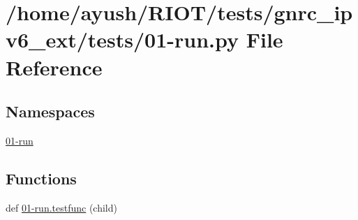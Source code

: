 \hypertarget{gnrc__ipv6__ext_2tests_201-run_8py}{}\section{/home/ayush/\+R\+I\+O\+T/tests/gnrc\+\_\+ipv6\+\_\+ext/tests/01-\/run.py File Reference}
\label{gnrc__ipv6__ext_2tests_201-run_8py}
\subsection*{Namespaces}
\begin{DoxyCompactItemize}
\item 
 \hyperlink{namespace01-run}{01-\/run}
\end{DoxyCompactItemize}
\subsection*{Functions}
\begin{DoxyCompactItemize}
\item 
def \hyperlink{namespace01-run_aff983ffd4ab0e6bf8e7e58970e4a10bb}{01-\/run.\+testfunc} (child)
\end{DoxyCompactItemize}
